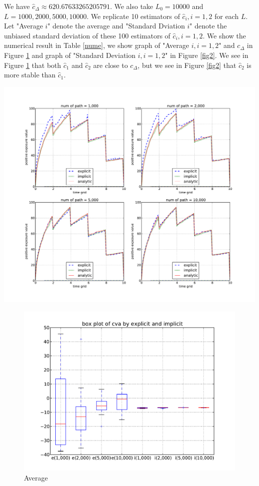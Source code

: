 \documentclass[12pt]{article}
\begin{document}
We have $\hat{c}_{\Delta}\approx 620.67633265205791.$ 
We also take $L_0=10000$ and $L=1000, 2000, 5000, 10000.$ 
We replicate 10 estimators of $\hat{c}_i, i=1,2$ for each $L$. Let "Average $i$" denote the average and "Standard Dviation $i$" denote
 the unbiased standard deviation of these 100 estimators of $\hat{c}_i, i=1,2.$ We show the numerical result in Table \ref{nume}, 
we show graph of "Average $i, i = 1,2$" and $c_{\Delta}$ in Figure \ref{fig1} and graph of "Standard Deviation $i, i=1,2$" in Figure \ref{fig2}.
\noindent 
We see in Figure \ref{fig1} that both $\hat{c}_1$ and $\hat{c}_2$ are close to $c_{\Delta}$,
but we see in Figure \ref{fig2} that $\hat{c}_2$ is more stable than $\hat{c}_1.$

\begin{center}
\includegraphics[width=18cm]{exposureAll.pdf}
\end{center}

\begin{figure}[htbp]
\begin{center}
\includegraphics[width=12cm]{BoxplotCva.pdf}
\caption{Average} \label{fig1}
\end{center}
\end{figure} 
\end{document}
